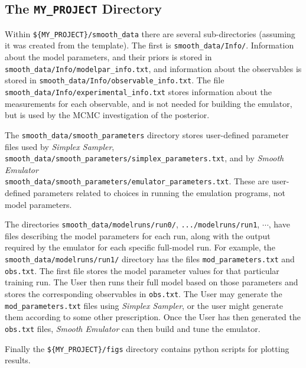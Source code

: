 \documentclass[UserManual.tex]{subfiles}
\begin{document}
\subsection{The {\tt MY\_PROJECT} Directory}

Within {\tt \$\{MY\_PROJECT\}/smooth\_data} there are several sub-directories (assuming it was created from the template). The first is {\tt smooth\_data/Info/}. Information about the model parameters, and their priors is stored in {\tt smooth\_data/Info/modelpar\_info.txt}, and information about the observables is stored in {\tt smooth\_data/Info/observable\_info.txt}. The file {\tt smooth\_data/Info/experimental\_info.txt} stores information about the measurements for each observable, and is not needed for building the emulator, but is used by the MCMC investigation of the posterior.

The {\tt smooth\_data/smooth\_parameters} directory stores user-defined parameter files used by {\it Simplex Sampler}, {\tt smooth\_data/smooth\_parameters/simplex\_parameters.txt}, and by {\it Smooth Emulator}\\{\tt smooth\_data/smooth\_parameters/emulator\_parameters.txt}. These are user-defined parameters related to choices in running the emulation programs, not model parameters.

The directories {\tt smooth\_data/modelruns/run0/}, {\tt  .../modelruns/run1}, $\cdots$, have files describing the model parameters for each run, along with the output required by the emulator for each specific full-model run. For example, the {\tt  smooth\_data/modelruns/run1/} directory has the files {\tt mod\_parameters.txt} and {\tt obs.txt}. The first file stores the model parameter values for that particular training run. The User then runs their full model based on those parameters and stores the corresponding observables in {\tt obs.txt}. The User may generate the {\tt mod\_parameters.txt} files using {\it Simplex Sampler}, or the user might generate them according to some other prescription. Once the User has then generated the {\tt obs.txt} files, {\it Smooth Emulator} can then build and tune the emulator.

Finally the {\tt\$\{MY\_PROJECT\}/figs} directory contains python scripts for plotting results.
\end{document}
